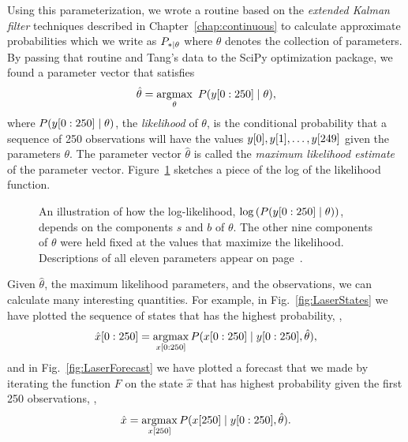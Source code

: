 Using this parameterization, we wrote a routine based on the
\emph{extended Kalman filter} %
%
%
techniques described in Chapter~\ref{chap:continuous} to calculate
approximate probabilities which we write as $P_{*\mid \theta}$ where
$\theta$ denotes the collection of parameters.   By passing that
routine and Tang's data to the SciPy optimization package, we found a
parameter vector that satisfies
\begin{equation}
  \label{eq:theta-hat-laser}
  \hat \theta = \operatorname*{argmax}_{\theta} ~ P(y[0:250]\mid \theta),
\end{equation}
where $P(y[0:250]\mid \theta)$, the \emph{likelihood} of
$\theta$, is the conditional probability that a sequence of 250
observations will have the values
${y}{[0]},{y}{[1]}, \ldots,{y}{[249]}$ given the parameters
$\theta$.  The parameter vector $\hat \theta$ is called the
\emph{maximum likelihood estimate} %
%
%
of the parameter vector.  Figure~\ref{fig:LaserLogLike} sketches a
piece of the log of the likelihood function.

\begin{figure}[htbp]
  \caption[Log likelihood as function of
  $s$ and $b$.]%
  {An illustration of how the log-likelihood,
    $\log \left(P(y[0:250]\mid \theta) \right)$, depends on
    the components $s$ and $b$ of $\theta$.  The other nine
    components of $\theta$ were held fixed at the values that maximize
    the likelihood.  Descriptions of all eleven parameters appear on
    page~\pageref{page:eleven_parameters}.}
  \label{fig:LaserLogLike}
\end{figure}

Given $\hat \theta$, the maximum likelihood parameters, and the
observations, we can calculate many interesting quantities.  For
example, in Fig.~\ref{fig:LaserStates} we have plotted the sequence of
states that has the highest probability, \ie,
\begin{equation}
  \label{eq:xhatSeq}
  \hat x[0:250] = \operatorname*{argmax}_{x[0:250]}
  P(x[0:250]\mid y[0:250],\hat \theta),
\end{equation}
and in Fig.~\ref{fig:LaserForecast} we have plotted a forecast that we
made by iterating the function $F$ on the state $\hat x$ that has
highest probability given the first 250 observations, \ie,
\begin{equation}
  \label{eq:xhat250}
  \hat x = \operatorname*{argmax}_{{x}{[250]}} P({x}{[250]}\mid y[0:250],\hat \theta).
\end{equation}

